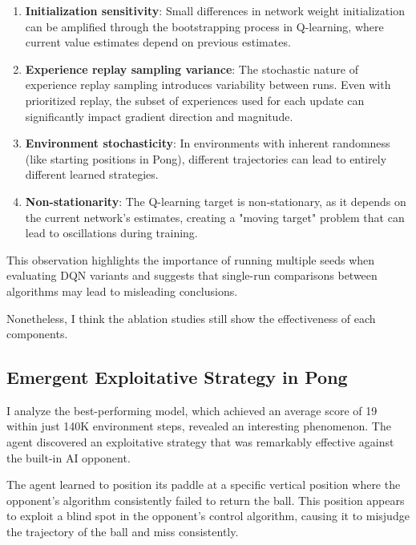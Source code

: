 \documentclass[a4paper]{article}
\begin{document}
\begin{enumerate}
    \item \textbf{Initialization sensitivity}: Small differences in network weight initialization can be amplified through the bootstrapping process in Q-learning, where current value estimates depend on previous estimates.
    
    \item \textbf{Experience replay sampling variance}: The stochastic nature of experience replay sampling introduces variability between runs. Even with prioritized replay, the subset of experiences used for each update can significantly impact gradient direction and magnitude.
    
    \item \textbf{Environment stochasticity}: In environments with inherent randomness (like starting positions in Pong), different trajectories can lead to entirely different learned strategies.
    
    \item \textbf{Non-stationarity}: The Q-learning target is non-stationary, as it depends on the current network's estimates, creating a "moving target" problem that can lead to oscillations during training.
\end{enumerate}


This observation highlights the importance of running multiple seeds when evaluating DQN variants and suggests that single-run comparisons between algorithms may lead to misleading conclusions.

Nonetheless, I think the ablation studies still show the effectiveness of each components.

\subsection{Emergent Exploitative Strategy in Pong}

I analyze the best-performing model, which achieved an average score of 19 within just 140K environment steps, revealed an interesting phenomenon. The agent discovered an exploitative strategy that was remarkably effective against the built-in AI opponent.

The agent learned to position its paddle at a specific vertical position where the opponent's algorithm consistently failed to return the ball. This position appears to exploit a blind spot in the opponent's control algorithm, causing it to misjudge the trajectory of the ball and miss consistently.
\end{document}
